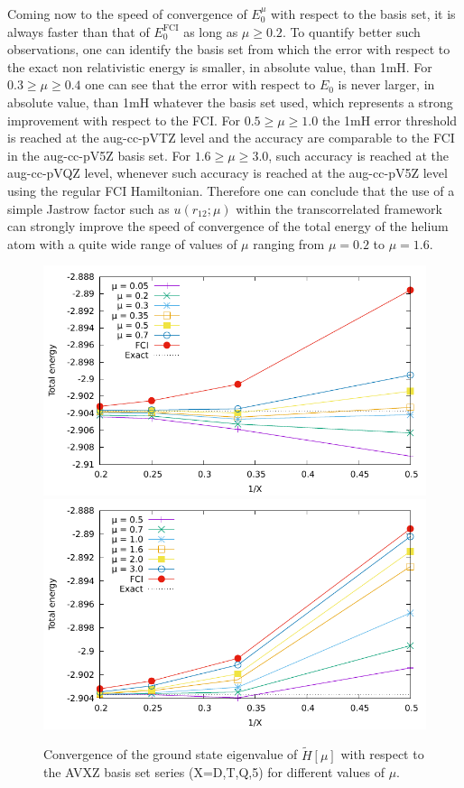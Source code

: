 \documentclass[aip,jcp,reprint,noshowkeys,superscriptaddress]{revtex4-1}
\begin{document}
Coming now to the speed of convergence of $E_0^\mu$ with respect to the basis set, it is always faster than that of $E_0^\text{FCI}$ as long as $\mu \ge 0.2$. 
To quantify better such observations, one can identify the basis set from which the error with respect to the exact non relativistic energy is smaller, in absolute value, than 1mH. 
For $0.3\ge\mu\ge0.4$ one can see that the error with respect to $E_0$ is never larger, in absolute value, than 1mH whatever the basis set used, which represents a strong improvement with respect to the FCI. For $0.5\ge \mu \ge 1.0$ the 1mH error threshold is reached at the aug-cc-pVTZ level and the accuracy are comparable to the FCI in the aug-cc-pV5Z basis set. For $1.6\ge \mu \ge 3.0$, such accuracy is reached at the aug-cc-pVQZ level, whenever such accuracy is reached at the aug-cc-pV5Z level using the regular FCI Hamiltonian. 
Therefore one can conclude that the use of a simple Jastrow factor such as $u(r_{12};\mu)$ within the transcorrelated framework can strongly improve the speed of convergence of the total energy of the helium atom with a quite wide range of values of $\mu$ ranging from $\mu=0.2$ to $\mu=1.6$. 
\begin{figure}
 \label{fig_conv_e_mu}
        \includegraphics[width=0.45\linewidth]{E_conv_basis_small_mu.pdf}
        \includegraphics[width=0.45\linewidth]{E_conv_basis_large_mu.pdf}\\
        \caption{Convergence of the ground state eigenvalue of $\tilde{H}[\mu]$ with respect to the AVXZ basis set series (X=D,T,Q,5) for different values of $\mu$.}
\end{figure}
\end{document}
